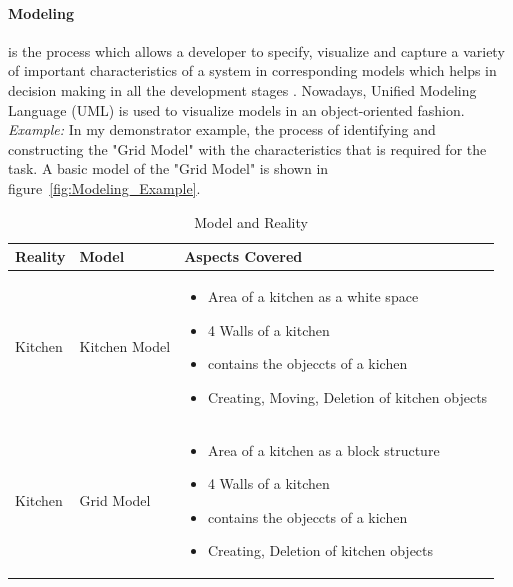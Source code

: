 \paragraph{Modeling} is the process which allows a developer to specify, visualize and capture a variety of important characteristics of a system in corresponding models which helps in decision making in all the development stages \cite{uml}. Nowadays, Unified Modeling Language (UML) \cite{uml} is used to visualize models in an object-oriented fashion.
\newline\newline\textit{Example:} In my demonstrator example, the process of identifying and constructing the "Grid Model" with the characteristics that is required for the task. A basic model of the "Grid Model" is shown in figure~\ref{fig:Modeling_Example}.

\begin{table}
	\centering	
	\begin{tabular}{|p{3cm}|p{3cm}|p{9cm}|}
		\hline
		\rowcolor[gray]{.8}	
		\textbf{Reality} & \textbf{Model} & \textbf{Aspects Covered} \\
		\hline
		Kitchen & Kitchen Model & 
		\begin{itemize}
			\item Area of a kitchen as a white space
			\item 4 Walls of a kitchen
			\item contains the objeccts of a kichen
			\item Creating, Moving, Deletion of kitchen objects
		\end{itemize}\\
		\hline
		Kitchen & Grid Model & 
		\begin{itemize}
			\item Area of a kitchen as a block structure
			\item 4 Walls of a kitchen
			\item contains the objeccts of a kichen
			\item Creating, Deletion of kitchen objects
		\end{itemize}\\
		\hline					
		
	\end{tabular}
	\label{tab:Model Reality}
	\caption{Model and Reality}
\end{table}

